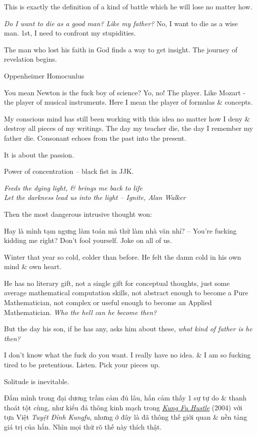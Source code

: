 \documentclass[12pt,twoside]{book}
\begin{document}
This is exactly the definition of a kind of battle which he will lose no matter how.

{\it Do I want to die as a good man? Like my father?} No, I want to die as a wise man. 1st, I need to confront my stupidities.

The man who lost his faith in God finds a way to get insight. The journey of revelation begins.

Oppenheimer Homocunlus

You mean Newton is the fuck boy of science? Yo, no! The player. Like Mozart - the player of musical instruments. Here I mean the player of formulas \& concepts.

My conscious mind has still been working with this idea no matter how I deny \& destroy all pieces of my writings. The day my teacher die, the day I remember my father die. Consonant echoes from the past into the present. 

It is about the passion.

Power of concentration -- black fist in JJK.

\begin{center}\it
	Feeds the dying light, \& brings me back to life\\
	Let the darkness lead us into the light 
	-- Ignite, {\sc Alan Walker}
\end{center}
Then the most dangerous intrusive thought won:

Hay là mình tạm ngưng làm toán mà thử làm nhà văn nhỉ? -- You're fucking kidding me right? Don't fool yourself. Joke on all of us.

Winter that year so cold, colder than before. He felt the damn cold in his own mind \& own heart.

He has no literary gift, not a single gift for conceptual thoughts, just some average mathematical computation skills, not abstract enough to become a Pure Mathematician, not complex or useful enough to become an Applied Mathematician. {\it Who the hell can he become then?}

But the day his son, if he has any, asks him about these, {\it what kind of father is he then?}

I don't know what the fuck do you want. I really have no idea. \& I am so fucking tired to be pretentious. Listen. Pick your pieces up.

Solitude is inevitable.

Đắm mình trong đại dương trầm cảm đủ lâu, hắn cảm thấy 1 sự tự do \& thanh thoát tột cùng, như kiểu đả thông kinh mạch trong \href{https://www.imdb.com/title/tt0373074/}{\it Kung Fu Hustle} (2004) với tựa Việt {\it Tuyệt Đỉnh Kungfu}, nhưng ở đây là đã thông thế giới quan \& nền tảng giá trị của hắn. Nhìn mọi thứ rõ thế này thích thật.
\end{document}
